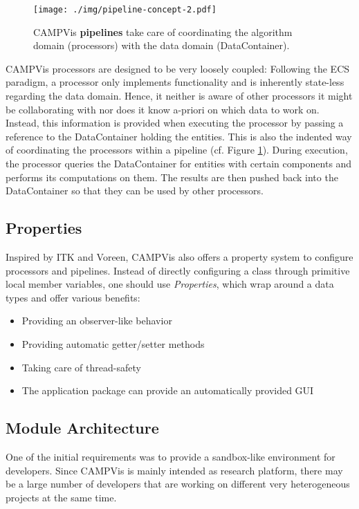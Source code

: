 \begin{figure}[htb]
	\centering
	\texttt{[image: ./img/pipeline-concept-2.pdf]}
	\caption{CAMPVis \textbf{pipelines} take care of coordinating the algorithm domain (processors) with the data domain (DataContainer).}
	\label{fig:pipeline-concept-2}
\end{figure}

CAMPVis processors are designed to be very loosely coupled: 
Following the ECS paradigm, a processor only implements functionality and is inherently state-less regarding the data domain.
Hence, it neither is aware of other processors it might be collaborating with nor does it know a-priori on which data to work on. 
Instead, this information is provided when executing the processor by passing a reference to the DataContainer holding the entities.
This is also the indented way of coordinating the processors within a pipeline (cf. Figure \ref{fig:pipeline-concept-2}).
During execution, the processor queries the DataContainer for entities with certain components and performs its computations on them. 
The results are then pushed back into the DataContainer so that they can be used by other processors.




\subsection{Properties}

Inspired by ITK and Voreen, CAMPVis also offers a property system to configure processors and pipelines.
Instead of directly configuring a class through primitive local member variables, one should use \emph{Properties}, which wrap around a data types and offer various benefits:
\begin{itemize}
	\item Providing an observer-like behavior
	\item Providing automatic getter/setter methods
	\item Taking care of thread-safety
	\item The application package can provide an automatically provided GUI
\end{itemize}


\subsection{Module Architecture}
\label{sec:module-architecture}

One of the initial requirements was to provide a sandbox-like environment for developers.
Since CAMPVis is mainly intended as research platform, there may be a large number of developers that are working on different very heterogeneous projects at the same time.

